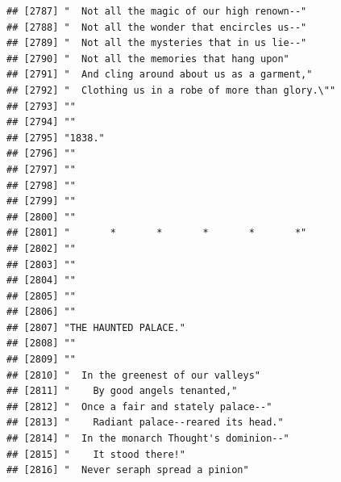 \documentclass{article}\usepackage[]{graphicx}\usepackage[]{color}
\makeatletter
\newenvironment{kframe}{%
 \def\at@end@of@kframe{}%
 \ifinner\ifhmode%
  \def\at@end@of@kframe{\end{minipage}}%
  \begin{minipage}{\columnwidth}%
 \fi\fi%
 \def\FrameCommand##1{\hskip\@totalleftmargin \hskip-\fboxsep
 \colorbox{shadecolor}{##1}\hskip-\fboxsep
     \hskip-\linewidth \hskip-\@totalleftmargin \hskip\columnwidth}%
 \MakeFramed {\advance\hsize-\width
   \@totalleftmargin\z@ \linewidth\hsize
   \@setminipage}}%
 {\par\unskip\endMakeFramed%
 \at@end@of@kframe}
\newenvironment{knitrout}{}{} %
\makeatother
\begin{document}
\begin{knitrout}
\begin{kframe}
\begin{verbatim}
## [2787] "  Not all the magic of our high renown--"                                    
## [2788] "  Not all the wonder that encircles us--"                                    
## [2789] "  Not all the mysteries that in us lie--"                                    
## [2790] "  Not all the memories that hang upon"                                       
## [2791] "  And cling around about us as a garment,"                                   
## [2792] "  Clothing us in a robe of more than glory.\""                               
## [2793] ""                                                                            
## [2794] ""                                                                            
## [2795] "1838."                                                                       
## [2796] ""                                                                            
## [2797] ""                                                                            
## [2798] ""                                                                            
## [2799] ""                                                                            
## [2800] ""                                                                            
## [2801] "       *       *       *       *       *"                                    
## [2802] ""                                                                            
## [2803] ""                                                                            
## [2804] ""                                                                            
## [2805] ""                                                                            
## [2806] ""                                                                            
## [2807] "THE HAUNTED PALACE."                                                         
## [2808] ""                                                                            
## [2809] ""                                                                            
## [2810] "  In the greenest of our valleys"                                            
## [2811] "    By good angels tenanted,"                                                
## [2812] "  Once a fair and stately palace--"                                          
## [2813] "    Radiant palace--reared its head."                                        
## [2814] "  In the monarch Thought's dominion--"                                       
## [2815] "    It stood there!"                                                         
## [2816] "  Never seraph spread a pinion"                                              

\end{verbatim}
\end{kframe}
\end{knitrout}
\end{document}
